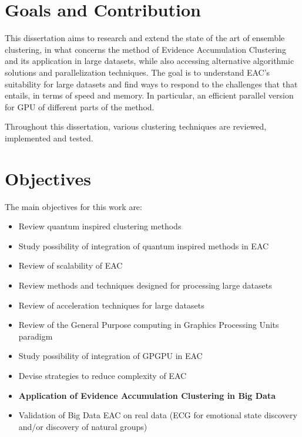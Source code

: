 
\section{Goals and Contribution}

This dissertation aims to research and extend the state of the art of ensemble clustering, in what concerns the method of Evidence Accumulation Clustering and its application in large datasets, while also accessing alternative algorithmic solutions and parallelization techniques. The goal is to understand EAC's suitability for large datasets and find ways to respond to the challenges that that entails, in terms of speed and memory. In particular, an efficient parallel version for GPU of different parts of the method.

Throughout this dissertation, various clustering techniques are reviewed, implemented and tested.

\section{Objectives}
The main objectives for this work are:
\begin{itemize}

\item Review quantum inspired clustering methods

\item Study possibility of integration of quantum inspired methods in EAC

\item Review of scalability of EAC

\item Review methods and techniques designed for processing large datasets

\item Review of acceleration techniques for large datasets

\item Review of the General Purpose computing in Graphics Processing Units paradigm

\item Study possibility of integration of GPGPU in EAC

\item Devise strategies to reduce complexity of EAC

\item \textbf{Application of Evidence Accumulation Clustering in Big Data}

\item Validation of Big Data EAC on real data (ECG for emotional state discovery and/or discovery of natural groups)
\end{itemize}


